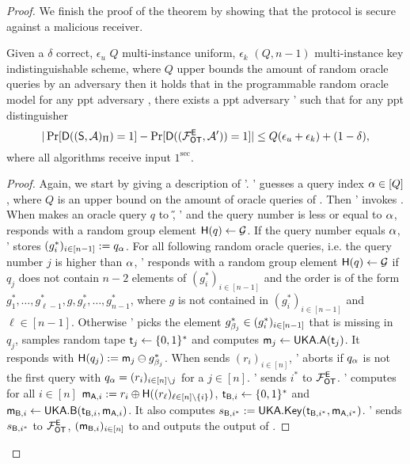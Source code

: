 \begin{proof}
We finish the proof of the theorem by showing that the \OT protocol is secure against a malicious receiver.
\begin{claim}\label{claim:malreceiver}
Given a $\delta$ correct, $\epsilon_u$ $Q$ multi-instance uniform, $\epsilon_k$ $(Q,n-1)$ multi-instance key indistinguishable  \UKA scheme, where $Q$ upper bounds the amount of random oracle queries by an adversary then it holds that in the programmable random oracle model for any ppt adversary \Adv, there exists a ppt adversary \Adv' such that for any ppt distinguisher \D
$$
|\Pr[\mathsf D((\mathsf{S}, \mathcal{A})_{\Pi})=1] -\Pr[\mathsf D((\mathcal{F}_{\mathsf{OT}}^\mathsf{E},\mathcal{A}'))=1]|\leq Q(\epsilon_{u}+\epsilon_{k})+(1-\delta),
$$
where all algorithms receive input $1^\sec$.
\end{claim}


\begin{proof}
Again, we start by giving a description of \Adv'. \Adv' guesses a query index $\alpha\in[Q]$, where $Q$ is an upper bound on the amount of oracle queries of \Adv. Then \Adv'  invokes \Adv.
When \Adv makes an oracle query $q$ to \H, \Adv' and the query number is less or equal to $\alpha$, \Adv responds with a random group element $\mathsf{H}(q)\leftarrow\mathcal{G}$. 
If the query number equals $\alpha$, \Adv' stores $(g^*_i)_{i\in[n-1]}:=q_{\alpha}$. 
For all following random oracle queries, i.e. the query number $j$ is higher than $\alpha$, \Adv ' responds with a random group element $\mathsf{H}(q)\leftarrow\mathcal{G}$ if $q_j$ does not contain $n-2$ elements of $(g^*_i)_{i\in[n-1]}$  and the order is of the form $g^*_1,\dots, g^*_{\ell-1},g,g^*_{\ell},\dots, g^*_{n-1}$, where $g$ is not contained in $(g^*_i)_{i\in[n-1]}$ and $\ell\in[n-1]$. Otherwise \Adv' picks the element $g^*_{\beta_j}\in(g^*_i)_{i\in[n-1]}$ that is missing in $q_j$,  samples random tape $\mathsf{t}_j\leftarrow\{0,1\}^*$ and computes $\mathsf{m}_{j}\leftarrow\mathsf{UKA}.\mathsf{A}(\mathsf{t}_j)$. 
It responds with $\mathsf{H}(q_j):=\mathsf{m}_j\ominus g^*_{\beta_j}$. When \Adv sends $(r_i)_{i\in[n]}$, \Adv' aborts if $q_{\alpha}$ is not the first query with $q_{\alpha}=(r_i)_{i\in[n]\setminus{j}}$ for a $j\in[n]$. \Adv' sends $i^*$ to $\mathcal{F}_{\mathsf{OT}}^\mathsf{E}$. \Adv' computes for all $i\in[n]$ $\mathsf{m}_{\mathsf{A},i}:=r_i\oplus\mathsf{H}((r_\ell)_{\ell\in[n]\setminus\{i\}})$, $\mathsf{t}_{\mathsf{B},i}\leftarrow\{0,1\}^*$ and $\mathsf{m}_{\mathsf{B},i}\leftarrow\mathsf{UKA}.\mathsf{B}(\mathsf{t}_{\mathsf{B},i},\mathsf{m}_{\mathsf{A},i})$. It also computes $s_{\mathsf{B},i^*}:=\mathsf{UKA}.\mathsf{Key}(\mathsf{t}_{\mathsf{B},i^*},\mathsf{m}_{\mathsf{A},i^*})$.
\Adv' sends $s_{\mathsf{B},i^*}$ to $\mathcal{F}_{\mathsf{OT}}^\mathsf{E}$, $(\mathsf{m}_{\mathsf{B},i})_{i\in[n]}$ to \Adv and outputs the output of \Adv.


\end{proof}
\end{proof}
